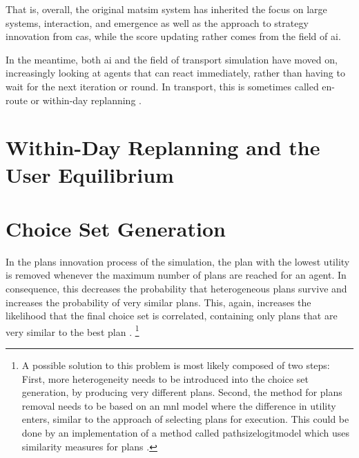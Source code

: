 That is, overall, the original \gls{matsim} system has inherited the focus on large systems, interaction, and emergence as well as the approach to strategy innovation from \gls{cas}, while the score updating rather comes from the field of \gls{ai}.

In the meantime, both \gls{ai} and the field of transport simulation have moved on, increasingly looking at agents that can react immediately, rather than having to wait for the next iteration or round.  In transport, this is sometimes called en-route or within-day replanning \citep[e.g.,][]{EmmerinkEtAl_TransResC_1995,balijepalli-2007}.


\section{Within-Day Replanning and the User Equilibrium}
\label{sec:researchavenues-withinday}

\vfill\eject
\section{Choice Set Generation}
\label{sec:choicesets}


In the plans innovation process of the simulation, the plan with the lowest utility is removed whenever the maximum number of plans are reached for an agent. In consequence, this decreases the probability that heterogeneous plans survive and increases the probability of very similar plans. This, again, increases the likelihood that the final choice set is correlated, \ie containing only plans that are very similar to the best plan \citep[see][for a review on correlation of 
 routes]{Prato2009ChoiceModellingSurvey}.%
 \footnote{
 A possible solution to this problem is most likely composed of two steps:
 First, more heterogeneity needs to be introduced into the choice set generation, \eg by producing very different plans.
 Second, the method for plans removal needs to be based on an \gls{mnl} model where the difference in utility enters, similar to the approach of selecting plans for execution. This could be done by an implementation of a method called \gls{pathsizelogitmodel} which uses similarity measures for plans \citep[see][for a possible solution in route choice]{FrejingerBierlaire2007PathSizeLogit, BenAkivaBierlaiere1999DiscreteChoice}.
 }


